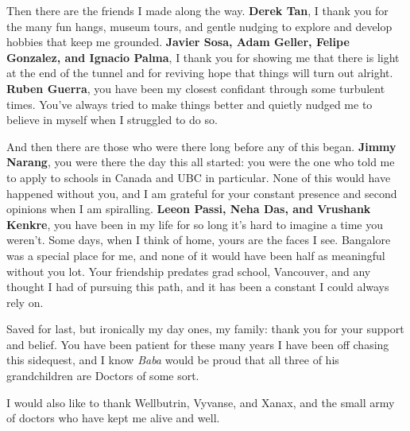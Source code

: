 Then there are the friends I made along the way.
\textbf{Derek Tan}, I thank you for the many fun hangs, museum tours, and gentle nudging to explore and develop hobbies that keep me grounded.
\textbf{Javier Sosa, Adam Geller, Felipe Gonzalez, and Ignacio Palma}, I thank you for showing me that there is light at the end of the tunnel and for reviving hope that things will turn out alright.
\textbf{Ruben Guerra}, you have been my closest confidant through some turbulent times.
You've always tried to make things better and quietly nudged me to believe in myself when I struggled to do so.

And then there are those who were there long before any of this began. 
\textbf{Jimmy Narang}, you were there the day this all started: you were the one who told me to apply to schools in Canada and UBC in particular.
None of this would have happened without you, and I am grateful for your constant presence and second opinions when I am spiralling.
\textbf{Leeon Passi, Neha Das, and Vrushank Kenkre}, you have been in my life for so long it's hard to imagine a time you weren't.
Some days, when I think of home, yours are the faces I see.
Bangalore was a special place for me, and none of it would have been half as meaningful without you lot.
Your friendship predates grad school, Vancouver, and any thought I had of pursuing this path, and it has been a constant I could always rely on.

Saved for last, but ironically my day ones, my family: thank you for your support and belief.
You have been patient for these many years I have been off chasing this sidequest, and I know \emph{Baba} would be proud that all three of his grandchildren are Doctors of some sort.

I would also like to thank Wellbutrin, Vyvanse, and Xanax, and the small army of doctors who have kept me alive and well.
